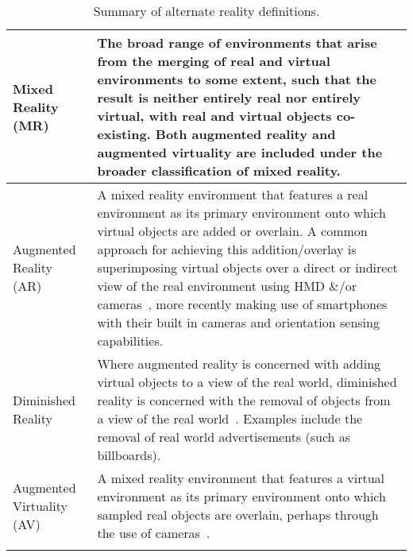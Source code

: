 \begin{center}
\begin{longtable}{ l p{10cm} }
Mixed Reality (MR) & The broad range of environments that arise from the merging of real and virtual environments to some extent, such that the result is neither entirely real nor entirely virtual, with real and virtual objects co-existing. Both augmented reality and augmented virtuality are included under the broader classification of mixed reality. \\

\hline
		

Augmented Reality (AR) & A mixed reality environment that features a real environment as its primary environment onto which virtual objects are added or overlain. A common approach for achieving this addition/overlay is superimposing virtual objects over a direct or indirect view of the real environment using HMD \&/or cameras~\cite{Krevelen2010}, more recently making use of smartphones with their built in cameras and orientation sensing capabilities. \\



\midrule


Diminished Reality & Where augmented reality is concerned with adding virtual objects to a view of the real world, diminished reality is concerned with the removal of objects from a view of the real world~\cite{Mann2002}. Examples include the removal of real world advertisements (such as billboards). \\

\midrule


Augmented Virtuality (AV) & A mixed reality environment that features a virtual environment as its primary environment onto which sampled real objects are overlain, perhaps through the use of cameras~\cite{caballero:behand}. \\


\bottomrule
\caption{Summary of alternate reality definitions.}
\label{adopted-alternate-reality-definitions}
\end{longtable}
\end{center}


